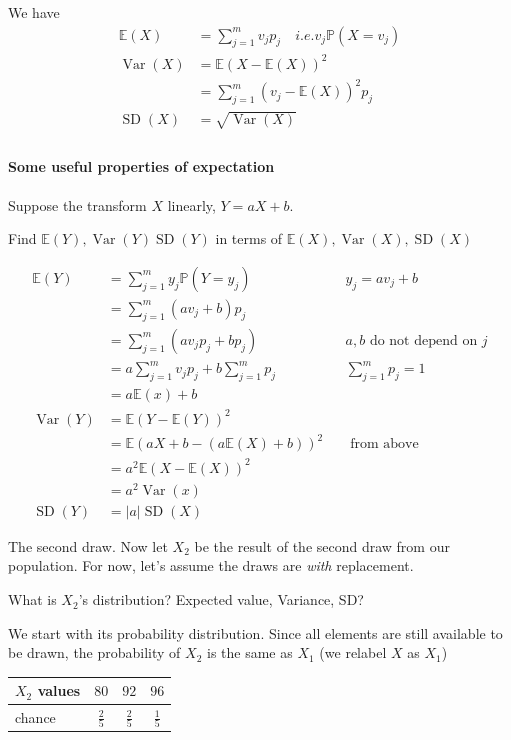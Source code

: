 \documentclass{tufte-handout}
\renewcommand{\P}[0]{\mathbb{P}}
\newcommand{\E}[0]{\mathbb{E}}
\DeclareMathOperator{\Var}{Var}
\DeclareMathOperator{\SD}{SD}
\begin{document}
We have \begin{align*}
	\E(X) &= \sum_{j=1}^m v_j p_j \quad i.e. v_j\P(X=v_j) \\
	\Var(X) &= \E (X-\E(X))^2 \\
		           &= \sum_{j=1}^m (v_j - \E(X))^2 p_j\\
	\SD(X) &= \sqrt{\Var(X)}\\
\end{align*}

\paragraph{Some useful properties of expectation} 

Suppose the transform $X$ linearly, $Y=aX+b$.

Find $\E(Y), \Var(Y) \SD(Y)$ in terms of $\E(X), \Var(X), \SD(X)$

\begin{align*}
	\E(Y) &= \sum_{j=1}^m y_j \P(Y=y_j) && y_j = av_j + b \\
	&= \sum_{j=1}^m (av_j + b) p_j \\
	&= \sum_{j=1}^m (av_j p_j + bp_j)  && a,b \text{ do not depend on } j \\
	&= a\sum_{j=1}^m v_jp_j + b \sum_{j=1}^m p_j && \sum_{j=1}^mp_j = 1 \\
	&= a\E(x) + b  \\
	\Var(Y) &= \E(Y-\E(Y))^2 \\
	&= \E(aX+b-(a\E(X)+b))^2 && \text{ from above} \\
	&= a^2 \E(X-\E(X))^2 \\
	&= a^2 \Var(x) \\
	\SD(Y) &= |a| \SD(X)
\end{align*}

The second draw. Now let $X_2$ be the result of the second draw from our population. For now, let's assume the draws are \emph{with} replacement. 

What is $X_2$'s distribution? Expected value, Variance, SD? 

We start with its probability distribution. Since all elements are still available to be drawn, the probability of $X_2$ is the same as $X_1$ (we relabel $X$ as $X_1$)
\begin{center}
		\begin{tabular}{l|ccc}
  $X_2$ values & $80$& $92$ & $96$\\
  \hline
  chance & $\frac{2}{5}$ &$\frac{2}{5}$&$\frac{1}{5}$ \\
\end{tabular}
\end{center}
\end{document}
